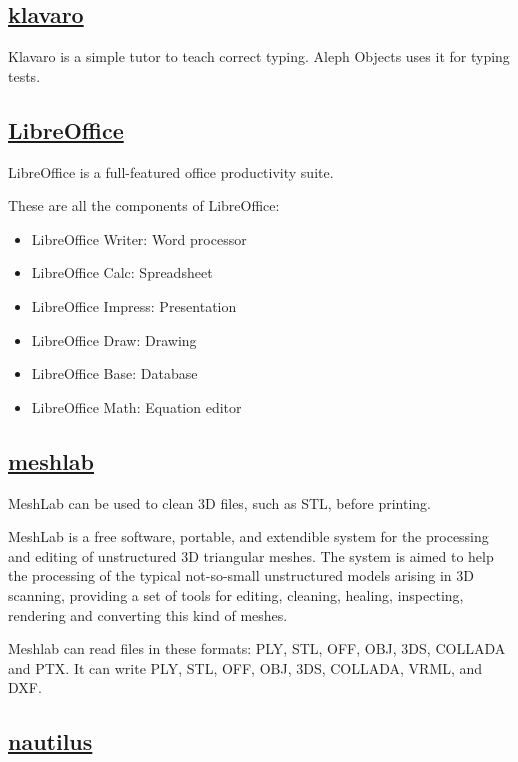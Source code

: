 \subsection{\href{http://klavaro.sourceforge.net/}{klavaro}}

Klavaro is a simple tutor to teach correct typing.
Aleph Objects uses it for typing tests.
 
\subsection{\href{http://www.libreoffice.org}{LibreOffice}}

 LibreOffice is a full-featured office productivity suite.
 
 These are all the components of LibreOffice:

\begin{itemize}
 \item LibreOffice Writer: Word processor
 \item LibreOffice Calc: Spreadsheet
 \item LibreOffice Impress: Presentation
 \item LibreOffice Draw: Drawing
 \item LibreOffice Base: Database
 \item LibreOffice Math: Equation editor
\end{itemize}
 
\subsection{\href{http://meshlab.sourceforge.net/}{meshlab}}

MeshLab can be used to clean 3D files, such as STL, before printing.

 MeshLab is a free software, portable, and extendible system for the
 processing and editing of unstructured 3D triangular meshes.
 The system is aimed to help the processing of the typical not-so-small
 unstructured models arising in 3D scanning, providing a set of tools for
 editing, cleaning, healing, inspecting, rendering and converting this kind
 of meshes.
 
 Meshlab can read files in these formats: PLY, STL, OFF, OBJ, 3DS, COLLADA
 and PTX. It can write PLY, STL, OFF, OBJ, 3DS, COLLADA, VRML, and DXF.

\subsection{\href{http://www.gnome.org/projects/nautilus/}{nautilus}}

